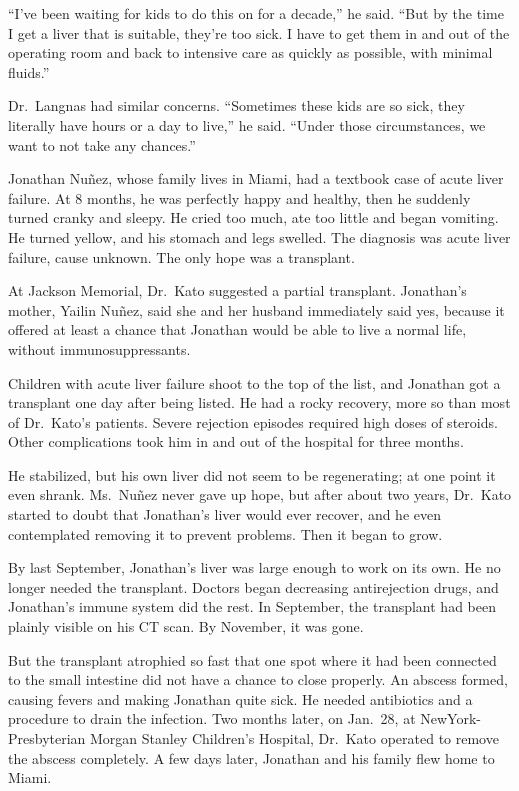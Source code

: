 ﻿\documentclass[12pt]{article}
\begin{document}
``I've been waiting for kids to do this on for a decade,'' he said. ``But by the time I get a liver
that is suitable, they're too sick. I have to get them in and out of the operating room and back to
intensive care as quickly as possible, with minimal fluids.''

Dr.~Langnas had similar concerns. ``Sometimes these kids are so sick, they literally have hours or a
day to live,'' he said. ``Under those circumstances, we want to not take any chances.''

Jonathan Nu\~{n}ez, whose family lives in Miami, had a textbook case of acute liver failure. At 8
months, he was perfectly happy and healthy, then he suddenly turned cranky and sleepy. He cried too
much, ate too little and began vomiting. He turned yellow, and his stomach and legs swelled. The
diagnosis was acute liver failure, cause unknown. The only hope was a transplant.

At Jackson Memorial, Dr.~Kato suggested a partial transplant. Jonathan's mother, Yailin Nu\~{n}ez,
said she and her husband immediately said yes, because it offered at least a chance that Jonathan
would be able to live a normal life, without immunosuppressants.

Children with acute liver failure shoot to the top of the list, and Jonathan got a transplant one
day after being listed. He had a rocky recovery, more so than most of Dr.~Kato's patients. Severe
rejection episodes required high doses of steroids. Other complications took him in and out of the
hospital for three months.

He stabilized, but his own liver did not seem to be regenerating; at one point it even shrank.
Ms.~Nu\~{n}ez never gave up hope, but after about two years, Dr.~Kato started to doubt that
Jonathan's liver would ever recover, and he even contemplated removing it to prevent problems. Then
it began to grow.

By last September, Jonathan's liver was large enough to work on its own. He no longer needed the
transplant. Doctors began decreasing antirejection drugs, and Jonathan's immune system did the rest.
In September, the transplant had been plainly visible on his CT scan. By November, it was gone.

But the transplant atrophied so fast that one spot where it had been connected to the small
intestine did not have a chance to close properly. An abscess formed, causing fevers and making
Jonathan quite sick. He needed antibiotics and a procedure to drain the infection. Two months later,
on Jan.~28, at NewYork-Presbyterian Morgan Stanley Children's Hospital, Dr.~Kato operated to remove
the abscess completely. A few days later, Jonathan and his family flew home to Miami.
\end{document}
